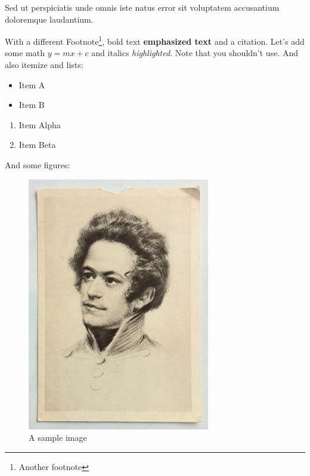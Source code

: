 \def \textwidth {15.92cm}
\def \halftextwidth {7.96cm}

Sed ut perspiciatis unde omnis iste natus error sit voluptatem accusantium doloremque laudantium.

With a different Footnote\footnote{Another footnote}, bold text \textbf{emphasized text} and a citation\cite{einstein2013principle}. Let's add some math $y = mx + c$ and italics \textit{highlighted}. Note that you shouldn't use. And also itemize and lists:
\begin{itemize}
	\item Item A
	\item Item B
\end{itemize}
\begin{enumerate}
	\item Item Alpha
	\item Item Beta
\end{enumerate}
And some figures:
\begin{figure}[H]
	\centering
	\includegraphics[width=\halftextwidth]{../resources/sample-image.png}
	\caption{A sample image}
	\label{fig:sample}
\end{figure}

